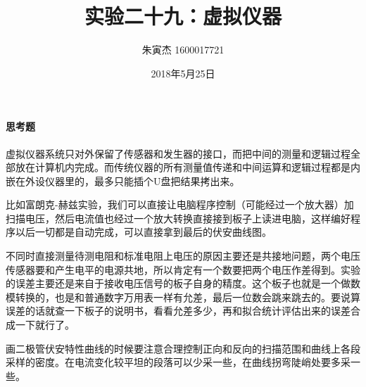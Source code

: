 \documentclass[UTF8]{ctexart}
\title{实验二十九：虚拟仪器}
\author{朱寅杰 1600017721}
\date{2018年5月25日}
\begin{document}
\maketitle
\paragraph{思考题}
虚拟仪器系统只对外保留了传感器和发生器的接口，而把中间的测量和逻辑过程全部放在计算机内完成。而传统仪器的所有测量值传递和中间运算和逻辑过程都是内嵌在外设仪器里的，最多只能插个U盘把结果拷出来。

比如富朗克-赫兹实验，我们可以直接让电脑程序控制（可能经过一个放大器）加扫描电压，然后电流值也经过一个放大转换直接接到板子上读进电脑，这样编好程序以后一切都是自动完成，可以直接拿到最后的伏安曲线图。

不同时直接测量待测电阻和标准电阻上电压的原因主要还是共接地问题，两个电压传感器要和产生电平的电源共地，所以肯定有一个数要把两个电压作差得到。实验的误差主要还是来自于接收电压信号的板子自身的精度。这个板子也就是一个做数模转换的，也是和普通数字万用表一样有允差，最后一位数会跳来跳去的。要说算误差的话就查一下板子的说明书，看看允差多少，再和拟合统计评估出来的误差合成一下就行了。

画二极管伏安特性曲线的时候要注意合理控制正向和反向的扫描范围和曲线上各段采样的密度。在电流变化较平坦的段落可以少采一些，在曲线拐弯陡峭处要多采一些。
\end{document}
